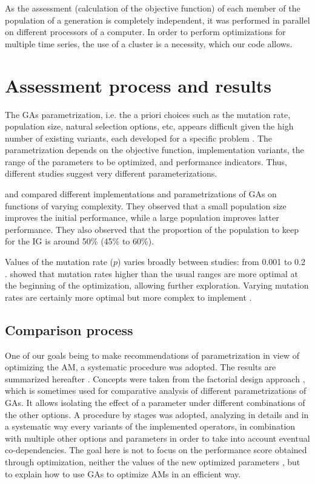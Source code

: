 \documentclass{ametsoc}
\begin{document}
As the assessment (calculation of the objective function) of each member of the population of a generation is completely independent, it was performed in parallel on different processors of a computer. In order to perform optimizations for multiple time series, the use of a cluster is a necessity, which our code allows.


\section{Assessment process and results}
\label{sec:assessment}

The GAs parametrization, i.e. the a priori choices such as the mutation rate, population size, natural selection options, etc, appears difficult given the high number of existing variants, each developed for a specific problem \citep{Haupt2004, Costa2007a}. The parametrization depends on the objective function, implementation variants, the range of the parameters to be optimized, and performance indicators. Thus, different studies suggest very different parameterizations.

\citet{DeJong1975a} and \citet{Grefenstette1986} compared different implementations and parametrizations of GAs on functions of varying complexity. They observed that a small population size improves the initial performance, while a large population improves latter performance. They also observed that the proportion of the population to keep for the IG is around 50\% (45\% to 60\%).

Values of the mutation rate ($p$) varies broadly between studies: from 0.001 \citep{DeJong1975a} to 0.2 \citep{Haupt2004}. \citet{Back1996b} showed that mutation rates higher than the usual ranges are more optimal at the beginning of the optimization, allowing further exploration. Varying mutation rates are certainly more optimal but more complex to implement \citep{Back1996a, Back1996b}.


\subsection{Comparison process}

One of our goals being to make recommendations of parametrization in view of optimizing the AM, a systematic procedure was adopted. The results are summarized hereafter \citep[see][for the details]{Horton2012a}. Concepts were taken from the factorial design approach \citep[see eg.][]{Costa2005a,Costa2007a,Mariano2010a}, which is sometimes used for comparative analysis of different parametrizations of GAs. It allows isolating the effect of a parameter under different combinations of the other options. A procedure by stages was adopted, analyzing in details and in a systematic way every variants of the implemented operators, in combination with multiple other options and parameters in order to take into account eventual co-dependencies. The goal here is not to focus on the performance score obtained through optimization, neither the values of the new optimized parameters \citep[covered in][]{Horton2016b}, but to explain how to use GAs to optimize AMs in an efficient way.
\end{document}
